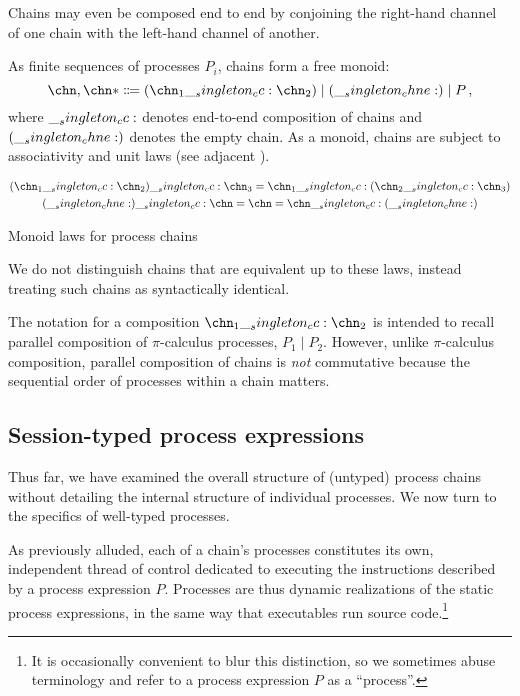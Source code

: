 Chains may even be composed end to end by conjoining the right-hand channel of one chain with the left-hand channel of another.

As finite sequences of processes $P_i$, chains form a free monoid:
\begin{equation*}
  \chn,\chn* \Coloneqq (\chn_1 \cc \chn_2) \mid (\chne) \mid P
  \,,
\end{equation*}
where $\__singleton_cc:$ denotes end-to-end composition of chains and $(\__singleton_chne:)$ denotes the empty chain.
As a monoid, chains are subject to associativity and unit laws (see adjacent ).
\begin{marginfigure}
\begin{gather*}
  (\chn_1 \cc \chn_2) \cc \chn_3 = \chn_1 \cc (\chn_2 \cc \chn_3) \\
  (\chne) \cc \chn = \chn = \chn \cc (\chne)
\end{gather*}
\caption{Monoid laws for process chains}\label{fig:chains:monoid-laws}
\end{marginfigure}
We do not distinguish chains that are equivalent up to these laws, instead treating such chains as syntactically identical.

The notation for a composition $\chn_1 \cc \chn_2$ is intended to recall parallel composition of $\pi$-calculus processes, $P_1 \mid P_2$.
However, unlike $\pi$-calculus composition, parallel composition of chains is \emph{not} commutative because the sequential order of processes within a chain matters.


\subsection{Session-typed process expressions}\label{sec:process-chains:typed-processes}

Thus far, we have examined the overall structure of (untyped) process chains without detailing the internal structure of individual processes.
We now turn to the specifics of well-typed processes.

As previously alluded, each of a chain's processes constitutes its own, independent thread of control dedicated to executing the instructions described by a process expression $P$.
Processes are thus dynamic realizations of the static process expressions, in the same way that executables run source code.\footnote{It is occasionally convenient to blur this distinction, so we sometimes abuse terminology and refer to a process expression $P$ as a \enquote{process}.}

